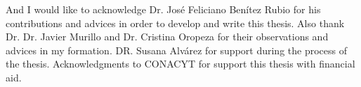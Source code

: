 
\begin{acknowledgements}      

And I would like to acknowledge Dr. Jos\'e Feliciano Ben\'itez Rubio for his contributions and advices in order to develop  and write this thesis. Also thank Dr. Dr. Javier Murillo and  Dr. Cristina Oropeza for their observations and advices in my formation. 
DR. Susana Alv\'arez for support during the process of the thesis. Acknowledgments to CONACYT for support this thesis with financial aid. 

\end{acknowledgements}
